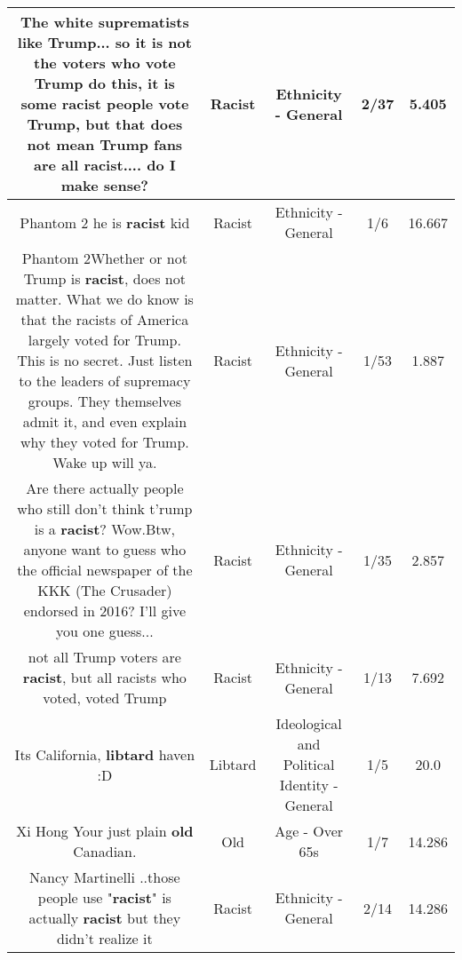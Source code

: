 \documentclass[11pt]{article}
\newlength\mylength
\begin{document}
\begin{center}
\begin{longtable}{|C{.65\mylength}|C{.30\mylength}|C{.12\mylength}|C{.12\mylength}|C{.12\mylength}|}
  \small The white suprematists like Trump... so it is not the voters who vote Trump do this, it is some \textbf{racist} people vote Trump, but that does not mean Trump fans are all \textbf{racist}.... do I make sense?\normalsize   & Racist & Ethnicity - General & 2/37 & 5.405 \\  \hline
  \small Phantom 2 he is \textbf{racist} kid\normalsize   & Racist & Ethnicity - General & 1/6 & 16.667 \\  \hline
  \small Phantom 2Whether or not Trump is \textbf{racist}, does not matter. What we do know is that the racists of America largely voted for Trump. This is no secret. Just listen to the leaders of supremacy groups. They themselves admit it, and even explain why they voted for Trump. Wake up will ya.\normalsize   & Racist & Ethnicity - General & 1/53 & 1.887 \\  \hline
  \small Are there actually people who still don't think t'rump is a \textbf{racist}? Wow.Btw, anyone want to guess who the official newspaper of the KKK (The Crusader) endorsed in 2016? I'll give you one guess...\normalsize   & Racist & Ethnicity - General & 1/35 & 2.857 \\  \hline
  \small not all Trump voters are \textbf{racist}, but all racists who voted, voted Trump\normalsize   & Racist & Ethnicity - General & 1/13 & 7.692 \\  \hline
  \small Its California, \textbf{libtard} haven :D\normalsize   & Libtard &  Ideological and Political Identity - General & 1/5 & 20.0 \\  \hline
  \small Xi Hong Your just plain \textbf{old} Canadian.\normalsize   & Old & Age - Over 65s & 1/7 & 14.286 \\  \hline
  \small Nancy Martinelli ..those people use "\textbf{racist}" is actually  \textbf{racist} but they didn't realize it\normalsize   & Racist & Ethnicity - General & 2/14 & 14.286 \\  \hline

\end{longtable}
\end{center}
\end{document}
